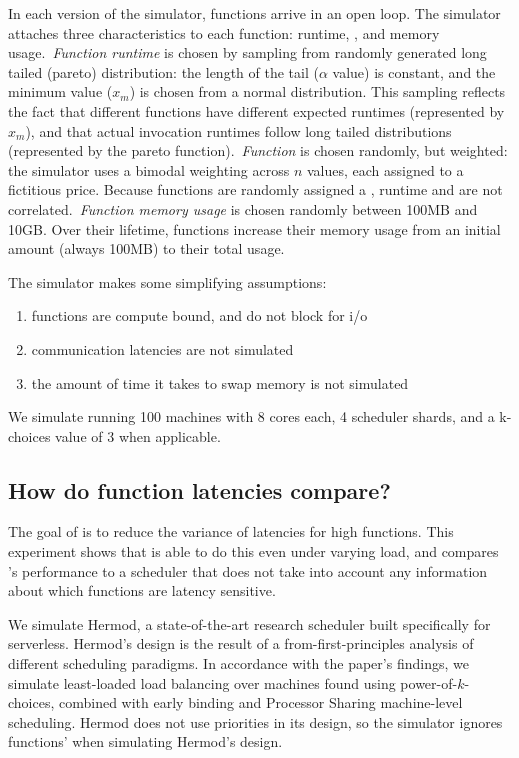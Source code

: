 In each version of the simulator, functions arrive in an open loop. The
simulator attaches three characteristics to each function: runtime,
\priceclass{}, and memory usage.~\textit{Function runtime} is chosen by sampling
from randomly generated long tailed (pareto) distribution: the length of the
tail ($\alpha$ value) is constant, and the minimum value ($x_m$) is chosen from
a normal distribution. This sampling reflects the fact that different functions
have different expected runtimes (represented by $x_m$), and that actual
invocation runtimes follow long tailed distributions (represented by the pareto
function).~\textit{Function \class{}} is chosen randomly, but weighted: the
simulator uses a bimodal weighting across $n$ \priceclass{} values, each
assigned to a fictitious price. Because functions are randomly assigned a
\class{}, runtime and \class{} are not correlated.~\textit{Function memory
usage} is chosen randomly between 100MB and 10GB. Over their lifetime, functions
increase their memory usage from an initial amount (always 100MB) to their total
usage.

The simulator makes some simplifying assumptions:
\begin{enumerate}
    \item functions are compute bound, and do not block for i/o
    \item communication latencies are not simulated
    \item the amount of time it takes to swap memory is not simulated
\end{enumerate}

We simulate running 100 machines with 8 cores each, 4 scheduler shards, and a
k-choices value of 3 when applicable.

\subsection{How do function latencies compare?}

The goal of \sys{} is to reduce the variance of latencies for high \priceclass{}
functions. This experiment shows that \sys{} is able to do this even under
varying load, and compares \sys{}'s performance to a scheduler that does not
take into account any information about which functions are latency sensitive.

We simulate Hermod\cite{hermod}, a state-of-the-art research scheduler built
specifically for serverless. Hermod's design is the result of a
from-first-principles analysis of different scheduling paradigms. In accordance
with the paper's findings, we simulate least-loaded load balancing over machines
found using power-of-$k$-choices, combined with early binding and Processor
Sharing machine-level scheduling. Hermod does not use priorities in its design,
so the simulator ignores functions' \class{} when simulating Hermod's design.

